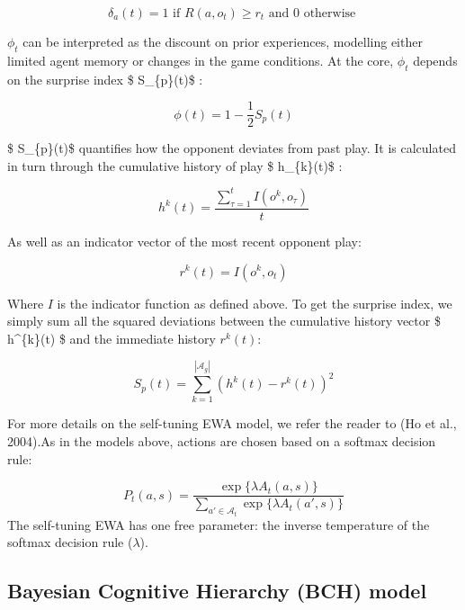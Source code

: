 \documentclass[man,floatsintext]{apa6}
\begin{document}
\[ \delta_{a}(t)  = 1  \text{  if  }  R(a,o_{t}) \geq r_{t}  \text{  and }  0 \text{  otherwise } \]

\(\phi_{t}\) can be interpreted as the discount on prior experiences, modelling either limited agent memory or changes in the game conditions. At the core, \(\phi_{t}\) depends on the surprise index \$ S\_\{p\}(t)\$ :

\[ \phi(t) = 1 - \frac{1}{2}S_{p}(t) \]

\$ S\_\{p\}(t)\$ quantifies how the opponent deviates from past play. It is calculated in turn through the cumulative history of play \$ h\_\{k\}(t)\$ :

\[  h^{k}(t)= \frac{\sum_{\tau =1}^t I(o^k,o_{\tau})}{t} \]

As well as an indicator vector of the most recent opponent play:

\[r^k(t) = I(o^k,o_{t})\]

Where \(I\) is the indicator function as defined above. To get the surprise index, we simply sum all the squared deviations between the cumulative history vector \$ h\^{}\{k\}(t) \$ and the immediate history \(r^k(t)\):

\[S_{p}(t) = \sum_{k=1}^{|\mathcal{A}_g|} (h^{k}(t) - r^k(t))^2 \]

For more details on the self-tuning EWA model, we refer the reader to (Ho et al., 2004).As in the models above, actions are chosen based on a softmax decision rule:

\[P_t(a,s) = \frac{\exp \{\lambda  A_{t}(a,s) \} }{\sum_{a' \in \mathcal{A}_t} \exp \{ \lambda A_{t}(a',s) \} } \]
The self-tuning EWA has one free parameter: the inverse temperature of the softmax decision rule (\(\lambda\)).

\subsection{Bayesian Cognitive Hierarchy (BCH) model}
\end{document}
